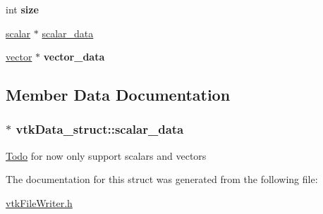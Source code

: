 \begin{DoxyCompactItemize}
\item 
\hypertarget{structvtkData__struct_a6b5dfacc2146df8af87ee1a34d52fe60}{
int {\bfseries size}}
\label{structvtkData__struct_a6b5dfacc2146df8af87ee1a34d52fe60}

\item 
\hyperlink{structscalar__struct}{scalar} $\ast$ \hyperlink{structvtkData__struct_a4ab251b4781410e11cdf0f70aeb4e1a7}{scalar\_\-data}
\item 
\hypertarget{structvtkData__struct_ae2419bcc3faa2669ba594ebe545c94b7}{
\hyperlink{structvector__struct}{vector} $\ast$ {\bfseries vector\_\-data}}
\label{structvtkData__struct_ae2419bcc3faa2669ba594ebe545c94b7}

\end{DoxyCompactItemize}


\subsection{Member Data Documentation}
\hypertarget{structvtkData__struct_a4ab251b4781410e11cdf0f70aeb4e1a7}{
\subsubsection[{scalar\_\-data}]{$\ast$ {\bf vtkData\_\-struct::scalar\_\-data}}}
\label{structvtkData__struct_a4ab251b4781410e11cdf0f70aeb4e1a7}
\begin{Desc}
\item[\hyperlink{todo__todo000005}{Todo}]for now only support scalars and vectors \end{Desc}


The documentation for this struct was generated from the following file:\begin{DoxyCompactItemize}
\item 
\hyperlink{vtkFileWriter_8h}{vtkFileWriter.h}\end{DoxyCompactItemize}
